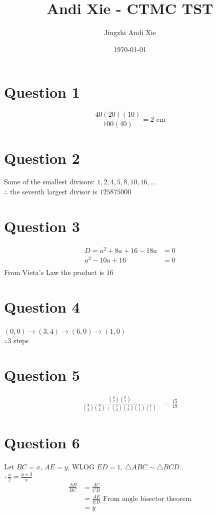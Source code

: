 \documentclass{article}
\title{Andi Xie - CTMC TST}
\author{Jingzhi Andi Xie}
\date{\today}
\begin{document}
\maketitle
\section*{Question 1}
$$\frac{40(20)(10)}{100(40)}=\boxed{2\text{ cm}}$$


\section*{Question 2}
Some of the smallest divisors: $1,2,4,5,8,10,16,\dots$\\
$\therefore$ the seventh largest divisor is $\boxed{125875000}$


\section*{Question 3}
\begin{align*}
    D=a^2+8a+16-18a&=0\\
    a^2-10a+16&=0\\
\end{align*}
From Vieta's Law the product is $\boxed{16}$


\section*{Question 4}
$(0,0)\rightarrow (3,4)\rightarrow (6,0)\rightarrow (1,0)$\\
$\therefore \boxed{3}$ steps


\section*{Question 5}
\begin{align*}
    \frac{{8\choose 2}{6\choose 2}}{{8\choose 2}{6\choose 2}+{1\choose 2}{1\choose 8}{1\choose 1}{1\choose 7}}&=\boxed{\frac{15}{19}}
\end{align*}


\section*{Question 6}
Let $BC=x$, $AE=y$, WLOG $ED=1$, $\triangle ABC\sim \triangle BCD$.\\
$\therefore \frac x 2=\frac{y+3}{x}$\\
\begin{align*}
    \frac{AB}{BC}&=\frac{AC}{CD}\\
    &=\frac{AE}{ED}\text{ From angle bisector theorem}\\
    &=y
\end{align*}
\end{document}
